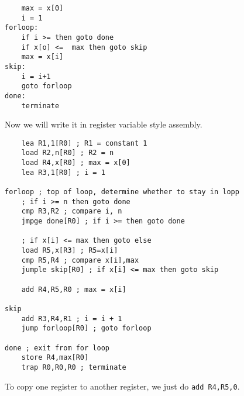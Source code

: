 \begin{verbatim}
    max = x[0]
    i = 1
forloop:
    if i >= then goto done
    if x[o] <=  max then goto skip
    max = x[i]
skip:
    i = i+1
    goto forloop
done:
    terminate
\end{verbatim}
Now we will write it in register variable style assembly.

\begin{verbatim}
    lea R1,1[R0] ; R1 = constant 1
    load R2,n[R0] ; R2 = n
    load R4,x[R0] ; max = x[0]
    lea R3,1[R0] ; i = 1

forloop ; top of loop, determine whether to stay in lopp
    ; if i >= n then goto done
    cmp R3,R2 ; compare i, n
    jmpge done[R0] ; if i >= then goto done

    ; if x[i] <= max then goto else
    load R5,x[R3] ; R5=x[i]
    cmp R5,R4 ; compare x[i],max
    jumple skip[R0] ; if x[i] <= max then goto skip

    add R4,R5,R0 ; max = x[i] 

skip
    add R3,R4,R1 ; i = i + 1
    jump forloop[R0] ; goto forloop

done ; exit from for loop
    store R4,max[R0]
    trap R0,R0,R0 ; terminate
\end{verbatim}

\begin{note}
	To copy one register to another register, we just do \texttt{add R4,R5,0}.
\end{note}



